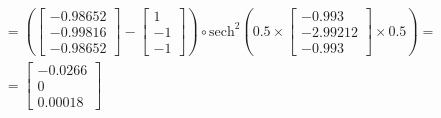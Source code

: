 \documentclass[12pt]{article}
\begin{document}
\begin{enumerate}[leftmargin=\labelsep]
\begin{align*}
                         & =  \left(\begin{bmatrix} -0.98652 \\ -0.99816 \\ -0.98652\end{bmatrix} - \begin{bmatrix} 1 \\ -1 \\ -1\end{bmatrix}\right) \circ \text{sech}^{2}\left(0.5\times \begin{bmatrix} -0.993 \\ -2.99212 \\ -0.993\end{bmatrix} \times 0.5\right) = \\
                         & = \begin{bmatrix} -0.0266 \\ 0 \\ 0.00018 \end{bmatrix}
        \end{align*}
        \endgroup


\end{enumerate}
\end{document}
